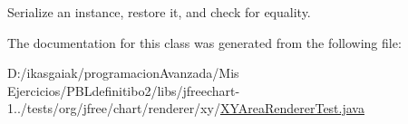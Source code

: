 Serialize an instance, restore it, and check for equality. 

The documentation for this class was generated from the following file\+:\begin{DoxyCompactItemize}
\item 
D\+:/ikasgaiak/programacion\+Avanzada/\+Mis Ejercicios/\+P\+B\+Ldefinitibo2/libs/jfreechart-\/1../tests/org/jfree/chart/renderer/xy/\mbox{\hyperlink{_x_y_area_renderer_test_8java}{X\+Y\+Area\+Renderer\+Test.\+java}}\end{DoxyCompactItemize}
